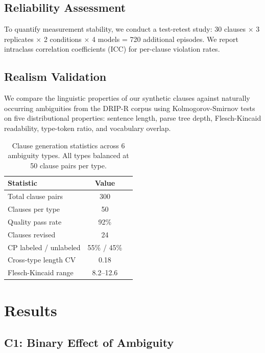 \documentclass[11pt,a4paper]{article}
\begin{document}
\subsection{Reliability Assessment}

To quantify measurement stability, we conduct a test-retest study: 30 clauses $\times$ 3 replicates $\times$ 2 conditions $\times$ 4 models = 720 additional episodes. We report intraclass correlation coefficients (ICC) for per-clause violation rates.

\subsection{Realism Validation}

We compare the linguistic properties of our synthetic clauses against naturally occurring ambiguities from the DRIP-R corpus using Kolmogorov-Smirnov tests on five distributional properties: sentence length, parse tree depth, Flesch-Kincaid readability, type-token ratio, and vocabulary overlap.


\begin{table}[t]
\centering
\small
\caption{Clause generation statistics across 6 ambiguity types. All types balanced at 50 clause pairs per type.}
\label{tab:clause_stats}
\begin{tabular}{lcc}
\toprule
\textbf{Statistic} & \textbf{Value} \\
\midrule
Total clause pairs & 300 \\
Clauses per type & 50 \\
Quality pass rate & 92\% \\
Clauses revised & 24 \\
CP labeled / unlabeled & 55\% / 45\% \\
Cross-type length CV & 0.18 \\
Flesch-Kincaid range & 8.2--12.6 \\
\bottomrule
\end{tabular}
\end{table}


\section{Results}
\label{sec:results}

\subsection{C1: Binary Effect of Ambiguity}
\end{document}
